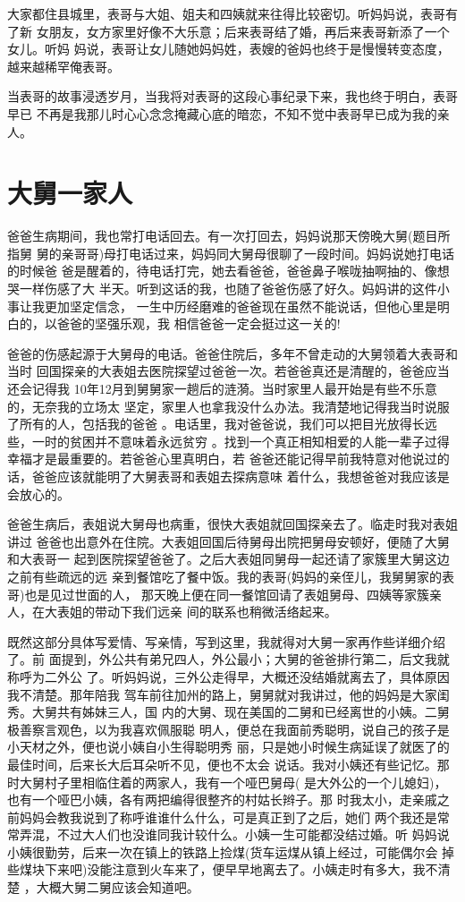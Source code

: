 \documentclass[12pt]{book}
\begin{document}
大家都住县城里，表哥与大姐、姐夫和四姨就来往得比较密切。听妈妈说，表哥有了新
女朋友，女方家里好像不大乐意；后来表哥结了婚，再后来表哥新添了一个女儿。听妈
妈说，表哥让女儿随她妈妈姓，表嫂的爸妈也终于是慢慢转变态度，越来越稀罕俺表哥。

当表哥的故事浸透岁月，当我将对表哥的这段心事纪录下来，我也终于明白，表哥早已
不再是我那儿时心心念念掩藏心底的暗恋，不知不觉中表哥早已成为我的亲人。
\section{大舅一家人}
\label{sec-9-23}

爸爸生病期间，我也常打电话回去。有一次打回去，妈妈说那天傍晚大舅(题目所指舅
舅的亲哥哥)母打电话过来，妈妈同大舅母很聊了一段时间。妈妈说她打电话的时候爸
爸是醒着的，待电话打完，她去看爸爸，爸爸鼻子喉咙抽啊抽的、像想哭一样伤感了大
半天。听到这话的我，也随了爸爸伤感了好久。妈妈讲的这件小事让我更加坚定信念，
一生中历经磨难的爸爸现在虽然不能说话，但他心里是明白的，以爸爸的坚强乐观，我
相信爸爸一定会挺过这一关的!

爸爸的伤感起源于大舅母的电话。爸爸住院后，多年不曾走动的大舅领着大表哥和当时
回国探亲的大表姐去医院探望过爸爸一次。若爸爸真还是清醒的，爸爸应当还会记得我
10年12月到舅舅家一趟后的涟漪。当时家里人最开始是有些不乐意的，无奈我的立场太
坚定，家里人也拿我没什么办法。我清楚地记得我当时说服了所有的人，包括我的爸爸
。电话里，我对爸爸说，我们可以把目光放得长远些，一时的贫困并不意味着永远贫穷
。找到一个真正相知相爱的人能一辈子过得幸福才是最重要的。若爸爸心里真明白，若
爸爸还能记得早前我特意对他说过的话，爸爸应该就能明了大舅表哥和表姐去探病意味
着什么，我想爸爸对我应该是会放心的。

爸爸生病后，表姐说大舅母也病重，很快大表姐就回国探亲去了。临走时我对表姐讲过
爸爸也出意外在住院。大表姐回国后待舅母出院把舅母安顿好，便随了大舅和大表哥一
起到医院探望爸爸了。之后大表姐同舅母一起还请了家簇里大舅这边之前有些疏远的远
亲到餐馆吃了餐中饭。我的表哥(妈妈的亲侄儿，我舅舅家的表哥)也是见过世面的人，
那天晚上便在同一餐馆回请了表姐舅母、四姨等家簇亲人，在大表姐的带动下我们远亲
间的联系也稍微活络起来。

既然这部分具体写爱情、写亲情，写到这里，我就得对大舅一家再作些详细介绍了。前
面提到，外公共有弟兄四人，外公最小；大舅的爸爸排行第二，后文我就称呼为二外公
了。听妈妈说，三外公走得早，大概还没结婚就离去了，具体原因我不清楚。那年陪我
驾车前往加州的路上，舅舅就对我讲过，他的妈妈是大家闺秀。大舅共有姊妹三人，国
内的大舅、现在美国的二舅和已经离世的小姨。二舅极善察言观色，以为我喜欢佩服聪
明人，便总在我面前秀聪明，说自己的孩子是小天材之外，便也说小姨自小生得聪明秀
丽，只是她小时候生病延误了就医了的最佳时间，后来长大后耳朵听不见，便也不太会
说话。我对小姨还有些记忆。那时大舅村子里相临住着的两家人，我有一个哑巴舅母(
是大外公的一个儿媳妇)，也有一个哑巴小姨，各有两把编得很整齐的村姑长辫子。那
时我太小，走亲戚之前妈妈会教我说到了称呼谁谁什么什么，可是真正到了之后，她们
两个我还是常常弄混，不过大人们也没谁同我计较什么。小姨一生可能都没结过婚。听
妈妈说小姨很勤劳，后来一次在镇上的铁路上捡煤(货车运煤从镇上经过，可能偶尔会
掉些煤块下来吧)没能注意到火车来了，便早早地离去了。小姨走时有多大，我不清楚
，大概大舅二舅应该会知道吧。
\end{document}

